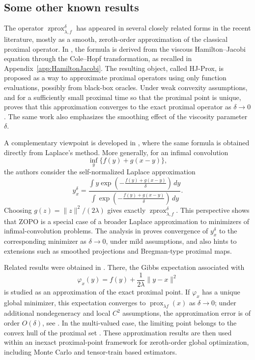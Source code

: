 \documentclass{article}
\newcommand{\prox}{\ensuremath{\operatorname{prox}}}
\newcommand{\zprox}{\ensuremath{\operatorname{zprox}}}
\begin{document}
\subsection{Some other known results}\label{app:known_results}

The operator \(\zprox_{\lambda,f}^{\delta}\) has appeared in several closely related forms in the recent literature, mostly as a smooth, zeroth-order approximation of the classical proximal operator. In \cite{osher2023hamilton}, the formula is derived from the viscous Hamilton--Jacobi equation through the Cole--Hopf transformation, as recalled in Appendix~\ref{app:HamiltonJacobi}. The resulting object, called HJ-Prox, is proposed as a way to approximate proximal operators using only function evaluations, possibly from black-box oracles. Under weak convexity assumptions, and for a sufficiently small proximal time so that the proximal point is unique, \cite[Theorem 1]{osher2023hamilton} proves that this approximation converges to the exact proximal operator as \(\delta\to0\). The same work also emphasizes the smoothing effect of the viscosity parameter \(\delta\).

A complementary viewpoint is developed in \cite{tibshirani2025laplace}, where the same formula is obtained directly from Laplace's method. More generally, for an infimal convolution
\[
    \inf_y \{f(y)+g(x-y)\},
\]
the authors consider the self-normalized Laplace approximation
\[
    y_x^\delta
    =
    \frac{
    \int y\exp\left(-\frac{f(y)+g(x-y)}{\delta}\right)\,dy
    }{
    \int \exp\left(-\frac{f(y)+g(x-y)}{\delta}\right)\,dy
    }.
\]
Choosing \(g(z)=\|z\|^2/(2\lambda)\) gives exactly \(\zprox_{\lambda,f}^{\delta}\). This perspective shows that ZOPO is a special case of a broader Laplace approximation to minimizers of infimal-convolution problems. The analysis in \cite{tibshirani2025laplace} proves convergence of \(y_x^\delta\) to the corresponding minimizer as \(\delta\to0\), under mild assumptions, and also hints to extensions such as smoothed projections and Bregman-type proximal maps.

Related results were obtained in \cite{zhang2024inexact}. There, the Gibbs expectation associated with
\[
    \varphi_x(y)=f(y)+\frac{1}{2\lambda}\|y-x\|^2
\]
is studied as an approximation of the exact proximal point. If \(\varphi_x\) has a unique global minimizer, this expectation converges to \(\prox_{\lambda f}(x)\) as \(\delta\to0\); under additional nondegeneracy and local \(C^2\) assumptions, the approximation error is of order \(O(\delta)\), see \cite[Theorem 4]{zhang2024inexact}. In the multi-valued case, the limiting point belongs to the convex hull of the proximal set \cite[Corollary 1]{zhang2024inexact}. These approximation results are then used within an inexact proximal-point framework for zeroth-order global optimization, including Monte Carlo and tensor-train based estimators.
\end{document}
